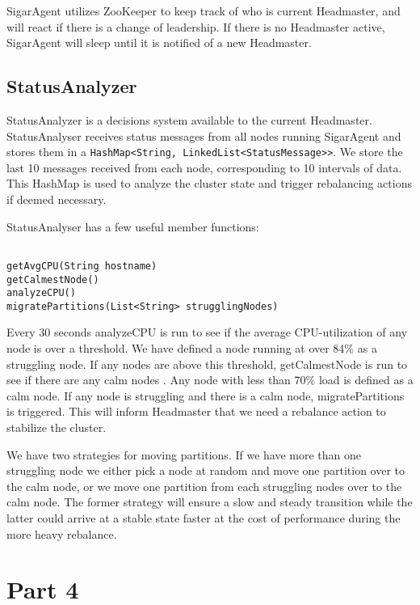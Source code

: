 SigarAgent utilizes ZooKeeper to keep track of who is current Headmaster, and will react if there is a change of leadership. If there is no Headmaster active, SigarAgent will sleep until it is notified of a new Headmaster. 

\subsection{StatusAnalyzer}
StatusAnalyzer is a decisions system available to the current Headmaster. StatusAnalyser receives status messages from all nodes running SigarAgent and stores them in a \texttt{HashMap<String, LinkedList<StatusMessage>>}. We store the last 10 messages received from each node, corresponding to 10 intervals of data. This HashMap is used to analyze the cluster state and trigger rebalancing actions if deemed necessary.

StatusAnalyser has a few useful member functions:

\begin{lstlisting}[style=customjava,label=lst:test,caption={Helper functions in StatusAnalyzer.}]

getAvgCPU(String hostname)
getCalmestNode()
analyzeCPU()
migratePartitions(List<String> strugglingNodes)

\end{lstlisting}

Every 30 seconds analyzeCPU is run to see if the average CPU-utilization of any node is over a threshold. We have defined a node running at over 84\% as a struggling node. If any nodes are above this threshold, getCalmestNode is run to see if there are any calm nodes . Any node with less than 70\% load is defined as a calm node. If any node is struggling and there is a calm node, migratePartitions is triggered. This will inform Headmaster that we need a rebalance action to stabilize the cluster. 

We have two strategies for moving partitions. If we have more than one struggling node we either pick a node at random and move one partition over to the calm node, or we move one partition from each struggling nodes over to the calm node. The former strategy will ensure a slow and steady transition while the latter could arrive at a stable state faster at the cost of performance during the more heavy rebalance. 

\section{Part 4}
